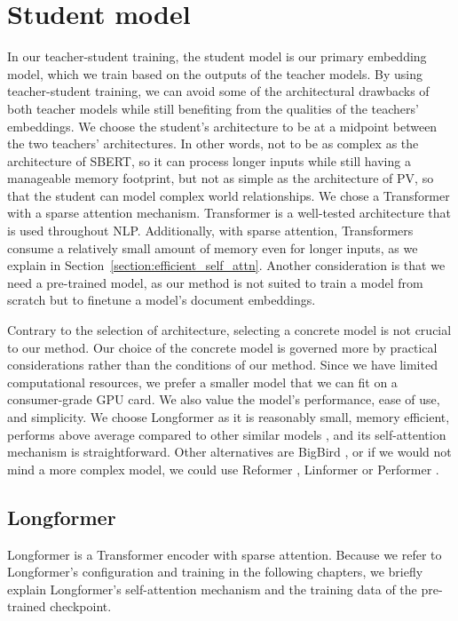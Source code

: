 \section{Student model}\label{section:student_model}

In our teacher-student training, the student model is our primary embedding
model, which we train based on the outputs of the teacher models. By using
teacher-student training, we can avoid some of the architectural drawbacks of
both teacher models while still benefiting from the qualities of the teachers'
embeddings. We choose the student's architecture to be at a midpoint between
the two teachers' architectures. In other words, not to be as complex as the
architecture of SBERT, so it can process longer inputs while still having a
manageable memory footprint, but not as simple as the architecture of PV, so
that the student can model complex world relationships. We chose a Transformer
with a sparse attention mechanism. Transformer is a well-tested architecture
that is used throughout NLP. Additionally, with sparse attention, Transformers
consume a relatively small amount of memory even for longer inputs, as we
explain in Section~\ref{section:efficient_self_attn}. Another consideration is
that we need a pre-trained model, as our method is not suited to train a model
from scratch but to finetune a model's document embeddings.

Contrary to the selection of architecture, selecting a concrete model is not
crucial to our method. Our choice of the concrete model is governed more by
practical considerations rather than the conditions of our method. Since we
have limited computational resources, we prefer a smaller model that we can fit
on a consumer-grade GPU card. We also value the model's performance, ease of
use, and simplicity. We choose Longformer \citep{beltagy2020longformer} as it
is reasonably small, memory efficient, performs above average compared to other
similar models \citep{tay2020long}, and its self-attention mechanism is
straightforward. Other alternatives are BigBird \citep{zaheer2020big}, or if we
would not mind a more complex model, we could use Reformer
\citep{kitaev2020reformer}, Linformer \citep{wang2020linformer} or Performer
\citep{choromanski2020rethinking}.

\subsection{Longformer}

Longformer \citep{beltagy2020longformer} is a Transformer encoder with sparse
attention. Because we refer to Longformer's configuration and training in the
following chapters, we briefly explain Longformer's self-attention mechanism
and the training data of the pre-trained checkpoint.


